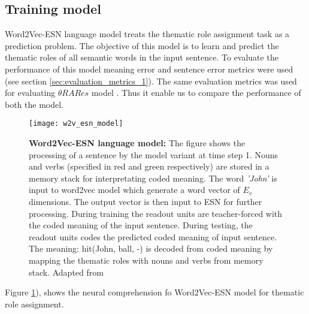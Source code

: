 \subsection{Training model}

Word2Vec-ESN language model treats the thematic role assignment task as a prediction problem. The objective of this model is to learn and predict the thematic roles of all semantic words in the input sentence. To evaluate the performance of this model meaning error and sentence error metrics were used (see section \ref{sec:evaluation_metrics_1}). The same evaluation metrics was used for evaluating $\theta RARes$ model \cite{xavier:2013:RT}. Thus it enable us to compare the performance of both the model.

\begin{figure}[hbtp]
\centering
\texttt{[image: w2v\_esn\_model]}
\caption[Neural comprehension of Word2Vec-ESN Model]{\textbf{Word2Vec-ESN language model:} The figure shows the processing of a sentence by the model variant at time step 1. Nouns and verbs (specified in red and green respectively) are stored in a memory stack for interpretating coded meaning. The word \textit{'John'} is input to word2vec model which generate a word vector of $E_{v}$ dimensions. The output vector is then input to ESN for further processing. During training the readout units are teacher-forced with the coded meaning of the input sentence. During testing, the readout units codes the predicted coded meaning of input sentence. The meaning: hit(John, ball, -) is decoded from coded meaning by mapping the thematic roles with nouns and verbs from memory stack. Adapted from \cite{xavier:2013:RT}} 
\label{fig:model_variant_1}
\end{figure}

Figure \ref{fig:model_variant_1}), shows the neural comprehension fo Word2Vec-ESN model for thematic role assignment.

